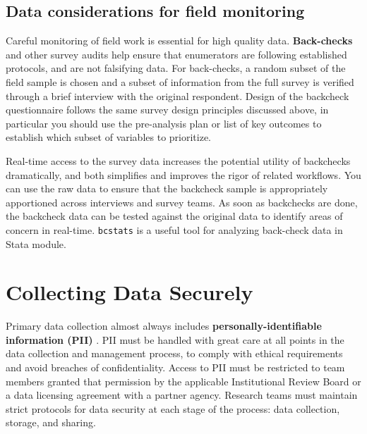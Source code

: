 \subsection{Data considerations for field monitoring}
Careful monitoring of field work is essential for high quality data. 
\textbf{Back-checks}
and other survey audits help ensure that enumerators are following established protocols, and are not falsifying data. 
For back-checks, a random subset of the field sample is chosen and a subset of information from the full survey is verified through a brief interview with the original respondent. Design of the backcheck questionnaire follows the same survey design principles discussed above, in particular you should use the pre-analysis plan or list of key outcomes to establish which subset of variables to prioritize. 

Real-time access to the survey data increases the potential utility of backchecks dramatically, and both simplifies and improves the rigor of related workflows. You can use the raw data to ensure that the backcheck sample is appropriately apportioned across interviews and survey teams. As soon as backchecks are done, the backcheck data can be tested against the original data to identify areas of concern in real-time. 
\texttt{bcstats} is a useful tool for analyzing back-check data in Stata module.


\section{Collecting Data Securely}
Primary data collection almost always includes 
\textbf{personally-identifiable information (PII)} 
. 
PII must be handled with great care at all points in the data collection and management process, to comply with ethical requirements and avoid breaches of confidentiality. Access to PII must be restricted to team members granted that permission by the applicable Institutional Review Board or a data licensing agreement with a partner agency. Research teams must maintain strict protocols for data security at each stage of the process: data collection, storage, and sharing. 


